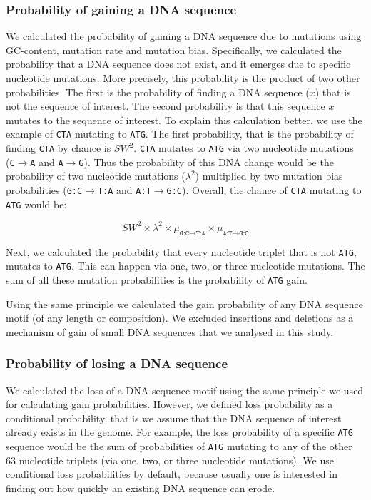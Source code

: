 \documentclass[12pt,a4paper]{article}
\begin{document}
\subsubsection{Probability of gaining a DNA sequence}
\label{methgain}

We calculated the probability of gaining a DNA sequence due to mutations using GC-content, mutation rate and mutation bias. Specifically, we calculated the probability that a DNA sequence does not exist, and it emerges due to specific nucleotide mutations. More precisely, this probability is the product of two other probabilities. The first is the probability of finding a DNA sequence ($x$) that is not the sequence of interest. The second probability is that this sequence $x$ mutates to the sequence of interest. To explain this calculation better, we use the example of \texttt{CTA} mutating to \texttt{ATG}. The first probability, that is the probability of finding \texttt{CTA} by chance is $SW^2$. \texttt{CTA} mutates to \texttt{ATG} via two nucleotide mutations (\texttt{C}$\to$\texttt{A} and \texttt{A}$\to$\texttt{G}). Thus the probability of this DNA change would be the probability of two nucleotide mutations ($\lambda^2$) multiplied by two mutation bias probabilities (\texttt{G:C}$\to$\texttt{T:A} and \texttt{A:T}$\to$\texttt{G:C}). Overall, the chance of \texttt{CTA} mutating to \texttt{ATG} would be:

$$SW^2 \times \lambda^2 \times \mu_{\texttt{G:C}\to\texttt{T:A}} \times \mu_{\texttt{A:T}\to\texttt{G:C}}$$

Next, we calculated the probability that every nucleotide triplet that is not \texttt{ATG}, mutates to \texttt{ATG}. This can happen via one, two, or three nucleotide mutations. The sum of all these mutation probabilities is the probability of \texttt{ATG} gain.

Using the same principle we calculated the gain probability of any DNA sequence motif (of any length or composition). We excluded insertions and deletions as a mechanism of gain of small DNA sequences that we analysed in this study. 

\subsubsection{Probability of losing a DNA sequence}

We calculated the loss of a DNA sequence motif using the same principle we used for calculating gain probabilities. However, we defined loss probability as a conditional probability, that is we assume that the DNA sequence of interest already exists in the genome. For example, the loss probability of a specific \texttt{ATG} sequence would be the sum of probabilities of \texttt{ATG} mutating to any of the other 63 nucleotide triplets (via one, two, or three nucleotide mutations). We use conditional loss probabilities by default, because usually one is interested in finding out how quickly an existing DNA sequence can erode.
\end{document}
